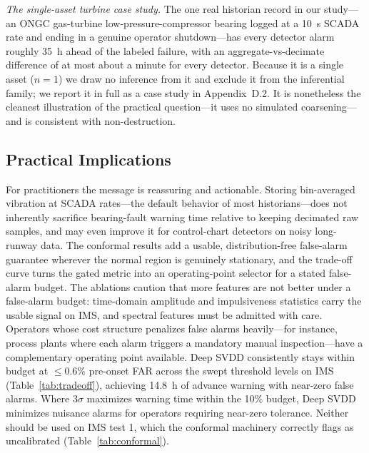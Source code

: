 \documentclass[IJPHM, 2026, 0]{PHMSociety}
\begin{document}
\emph{The single-asset turbine case study.} The one real historian record in our study---an ONGC gas-turbine low-pressure-compressor bearing logged at a 10~s SCADA rate and ending in a genuine operator shutdown---has every detector alarm roughly 35~h ahead of the labeled failure, with an aggregate-vs-decimate difference of at most about a minute for every detector. Because it is a single asset ($n=1$) we draw no inference from it and exclude it from the inferential family; we report it in full as a case study in Appendix~D.2. It is nonetheless the cleanest illustration of the practical question---it uses no simulated coarsening---and is consistent with non-destruction.

\subsection{Practical Implications}
For practitioners the message is reassuring and actionable. Storing bin-averaged vibration at SCADA rates---the default behavior of most historians---does not inherently sacrifice bearing-fault warning time relative to keeping decimated raw samples, and may even improve it for control-chart detectors on noisy long-runway data. The conformal results add a usable, distribution-free false-alarm guarantee wherever the normal region is genuinely stationary, and the trade-off curve turns the gated metric into an operating-point selector for a stated false-alarm budget. The ablations caution that more features are not better under a false-alarm budget: time-domain amplitude and impulsiveness statistics carry the usable signal on IMS, and spectral features must be admitted with care. Operators whose cost structure penalizes false alarms heavily---for instance, process plants where each alarm triggers a mandatory manual inspection---have a complementary operating point available. Deep SVDD consistently stays within budget at $\le 0.6\%$ pre-onset FAR across the swept threshold levels on IMS (Table~\ref{tab:tradeoff}), achieving 14.8~h of advance warning with near-zero false alarms. Where $3\sigma$ maximizes warning time within the 10\% budget, Deep SVDD minimizes nuisance alarms for operators requiring near-zero tolerance. Neither should be used on IMS test 1, which the conformal machinery correctly flags as uncalibrated (Table~\ref{tab:conformal}).
\end{document}
